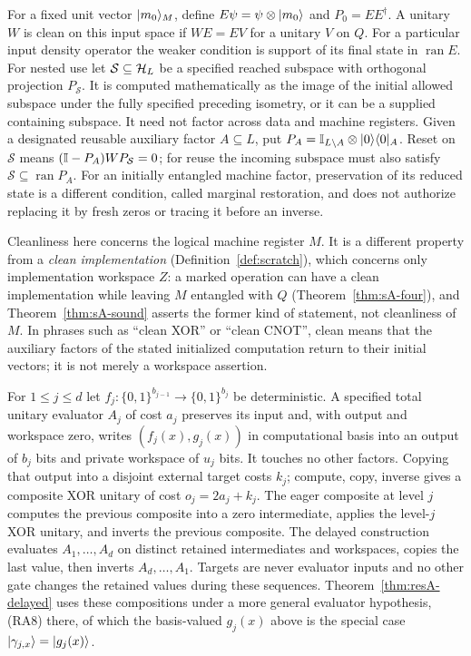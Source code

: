 \begin{definition}
\label{def:clean}
For a fixed unit vector $\lvert m_0\rangle_M$, define
$E\psi=\psi\otimes\lvert m_0\rangle$ and $P_0=EE^\dagger$.
A unitary $W$ is clean on this input space if $WE=EV$ for a unitary
$V$ on $Q$. For a particular input density operator the weaker condition
is support of its final state in $\operatorname{ran}E$.
For nested use let $\mathcal S\subseteq\mathcal{H}_L$ be a specified reached
subspace with orthogonal projection $P_{\mathcal S}$. It is computed
mathematically as the image of the initial allowed subspace under the
fully specified preceding isometry, or it can be a supplied containing
subspace. It need not factor across data and machine registers.
Given a designated reusable auxiliary factor $A\subseteq L$, put
$P_A=\mathbb{I}_{L\setminus A}\otimes\lvert 0\rangle\langle 0\rvert_A$. Reset on $\mathcal S$ means
$(\mathbb{I}-P_A)WP_{\mathcal S}=0$; for reuse the incoming subspace must
also satisfy $\mathcal S\subseteq\operatorname{ran}P_A$.
For an initially entangled machine factor, preservation of its reduced
state is a different condition, called marginal restoration, and does
not authorize replacing it by fresh zeros or tracing it before an inverse.

Cleanliness here concerns the logical machine register $M$. It is a
different property from a \emph{clean implementation}
(Definition~\ref{def:scratch}), which concerns only implementation
workspace $Z$: a marked operation can have a clean implementation while
leaving $M$ entangled with $Q$ (Theorem~\ref{thm:sA-four}), and
Theorem~\ref{thm:sA-sound} asserts the former kind of statement, not
cleanliness of $M$. In phrases such as ``clean XOR'' or ``clean CNOT'',
clean means that the auxiliary factors of the stated initialized
computation return to their initial vectors; it is not merely a
workspace assertion.
\end{definition}


\begin{definition}\label{def:delayed}
For $1\leq j\leq d$ let
$f_j:\{0,1\}^{b_{j-1}}\to\{0,1\}^{b_j}$ be deterministic.
A specified total unitary evaluator $A_j$ of cost $a_j$ preserves its
input and, with output and workspace zero, writes
$(f_j(x),g_j(x))$ in computational basis into an output of $b_j$ bits
and private workspace of $u_j$ bits. It touches no other factors.
Copying that output into a disjoint external target costs $k_j$;
compute, copy, inverse gives a composite XOR unitary of cost
$o_j=2a_j+k_j$. The eager composite at level $j$ computes the previous
composite into a zero intermediate, applies the level-$j$ XOR unitary,
and inverts the previous composite. The delayed construction evaluates $A_1,\ldots,A_d$ on
distinct retained intermediates and workspaces, copies the last value,
then inverts $A_d,\ldots,A_1$. Targets are never evaluator inputs and no
other gate changes the retained values during these sequences.
Theorem~\ref{thm:resA-delayed} uses these compositions under a more general
evaluator hypothesis, (RA8) there, of which the basis-valued $g_j(x)$ above
is the special case $\lvert \gamma_{j,x}\rangle=\lvert g_j(x)\rangle$.
\end{definition}


